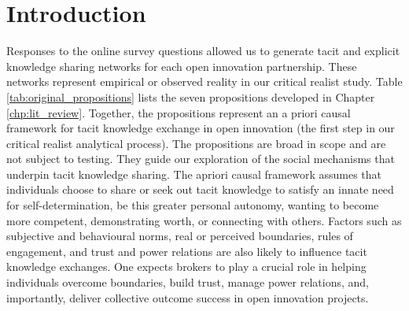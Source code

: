 \section{Introduction} 

Responses to the online survey questions allowed us to generate tacit and explicit knowledge sharing networks for each open innovation partnership. These networks represent empirical or observed reality in our critical realist study. Table \ref{tab:original_propositions} lists the seven propositions developed in Chapter \ref{chp:lit_review}. Together, the propositions represent an a priori causal framework for tacit knowledge exchange in open innovation (the first step in our critical realist analytical process). The propositions are broad in scope and are not subject to testing. They guide our exploration of the social mechanisms that underpin tacit knowledge sharing. The apriori causal framework assumes that individuals choose to share or seek out tacit knowledge to satisfy an innate need for self-determination, be this greater personal autonomy, wanting to become more competent, demonstrating worth, or connecting with others. Factors such as subjective and behavioural norms, real or perceived boundaries, rules of engagement, and trust and power relations are also likely to influence tacit knowledge exchanges. One expects brokers to play a crucial role in helping individuals overcome boundaries, build trust, manage power relations, and, importantly, deliver collective outcome success in open innovation projects. \medskip

\begin{table}[hbt!]
\centering
\caption{Original list of propositions.}
\label{tab:original_propositions}
\end{table}

